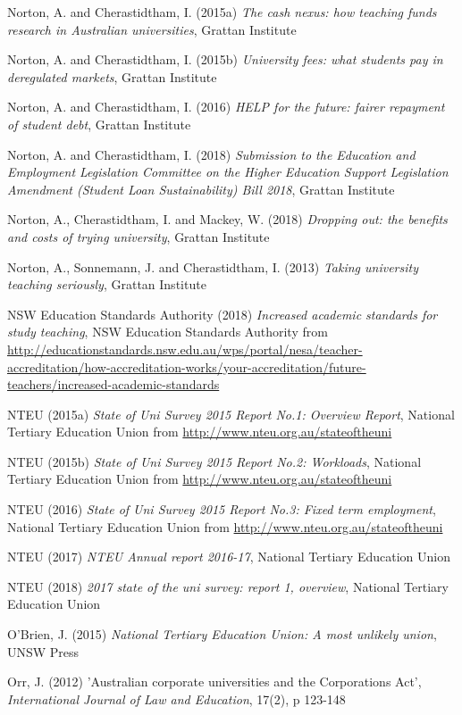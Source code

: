\documentclass[]{book}
\begin{document}
Norton, A. and Cherastidtham, I. (2015a) \emph{The cash nexus: how teaching funds research in Australian universities}, Grattan Institute

Norton, A. and Cherastidtham, I. (2015b) \emph{University fees: what students pay in deregulated markets}, Grattan Institute

Norton, A. and Cherastidtham, I. (2016) \emph{HELP for the future: fairer repayment of student debt}, Grattan Institute

Norton, A. and Cherastidtham, I. (2018) \emph{Submission to the Education and Employment Legislation Committee on the Higher Education Support Legislation Amendment (Student Loan Sustainability) Bill 2018}, Grattan Institute

Norton, A., Cherastidtham, I. and Mackey, W. (2018) \emph{Dropping out: the benefits and costs of trying university}, Grattan Institute

Norton, A., Sonnemann, J. and Cherastidtham, I. (2013) \emph{Taking university teaching seriously}, Grattan Institute

NSW Education Standards Authority (2018) \emph{Increased academic standards for study teaching}, NSW Education Standards Authority from \url{http://educationstandards.nsw.edu.au/wps/portal/nesa/teacher-accreditation/how-accreditation-works/your-accreditation/future-teachers/increased-academic-standards}

NTEU (2015a) \emph{State of Uni Survey 2015 Report No.1: Overview Report}, National Tertiary Education Union from \url{http://www.nteu.org.au/stateoftheuni}

NTEU (2015b) \emph{State of Uni Survey 2015 Report No.2: Workloads}, National Tertiary Education Union from \url{http://www.nteu.org.au/stateoftheuni}

NTEU (2016) \emph{State of Uni Survey 2015 Report No.3: Fixed term employment}, National Tertiary Education Union from \url{http://www.nteu.org.au/stateoftheuni}

NTEU (2017) \emph{NTEU Annual report 2016-17}, National Tertiary Education Union

NTEU (2018) \emph{2017 state of the uni survey: report 1, overview}, National Tertiary Education Union

O'Brien, J. (2015) \emph{National Tertiary Education Union: A most unlikely union}, UNSW Press

Orr, J. (2012) 'Australian corporate universities and the Corporations Act', \emph{International Journal of Law and Education}, 17(2), p 123-148
\end{document}
